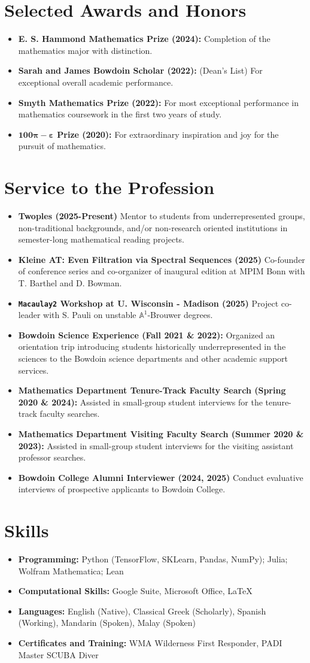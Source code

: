 \documentclass[letterpaper,11pt]{article}
\newcommand{\resumeItem}[2]{
  \item\small{
    \textbf{#1}{ #2 \vspace{-2pt}}
  }
}
\newcommand{\resumeSubItem}[2]{\resumeItem{#1}{#2}\vspace{-4pt}}
\newcommand{\resumeSubHeadingListStart}{\begin{itemize}[leftmargin=*]}
\newcommand{\resumeSubHeadingListEnd}{\end{itemize}}
\begin{document}
 \section{Selected Awards and Honors}
\resumeSubHeadingListStart
\resumeSubItem{E. S. Hammond Mathematics Prize (2024):}{ Completion of the mathematics major with distinction.}
\resumeSubItem{Sarah and James Bowdoin Scholar (2022):}{(Dean's List) For exceptional overall academic performance.}
\resumeSubItem{Smyth Mathematics Prize (2022):}{For most exceptional performance in mathematics coursework in the first two years of study.}
\resumeSubItem{$\bm{100\pi-\varepsilon}$ Prize (2020):}{For extraordinary inspiration and joy for the pursuit of mathematics.}
\resumeSubHeadingListEnd
  \section{Service to the Profession}
\resumeSubHeadingListStart
 \resumeSubItem{Twoples (2025-Present)}{Mentor to students from underrepresented groups, non-traditional backgrounds, and/or non-research oriented institutions in semester-long mathematical reading projects.}
 \resumeSubItem{Kleine AT: Even Filtration via Spectral Sequences (2025)}{Co-founder of conference series and co-organizer of inaugural edition at MPIM Bonn with T. Barthel and D. Bowman.}
 \resumeSubItem{\texttt{Macaulay2} Workshop at U. Wisconsin - Madison (2025)}{Project co-leader with S. Pauli on unstable $\mathbb{A}^{1}$-Brouwer degrees.}
 \resumeSubItem{Bowdoin Science Experience (Fall 2021 \& 2022):}{Organized an orientation trip introducing students historically underrepresented in the sciences to the Bowdoin science departments and other academic support services.}
\resumeSubItem{Mathematics Department Tenure-Track Faculty Search (Spring 2020 \& 2024):}{Assisted in small-group student interviews for the tenure-track faculty searches.}
\resumeSubItem{Mathematics Department Visiting Faculty Search (Summer 2020 \& 2023):}{Assisted in small-group student interviews for the visiting assistant professor searches.}
 \resumeSubItem{Bowdoin College Alumni Interviewer (2024, 2025)}{Conduct evaluative interviews of prospective applicants to Bowdoin College.}
\resumeSubHeadingListEnd
\section{Skills}
 \resumeSubHeadingListStart
 \resumeSubItem{Programming: }{Python (TensorFlow, SKLearn, Pandas, NumPy); Julia; Wolfram Mathematica; Lean}
 \resumeSubItem{Computational Skills: }{Google Suite, Microsoft Office, \LaTeX}
 \resumeSubItem{Languages:}{English (Native), Classical Greek (Scholarly), Spanish (Working), Mandarin (Spoken), Malay (Spoken)}
 \resumeSubItem{Certificates and Training:}{WMA Wilderness First Responder, PADI Master SCUBA Diver}
 \resumeSubHeadingListEnd
\end{document}

